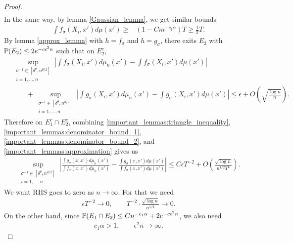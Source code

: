 \begin{proof}
\begin{align}
    \end{align}
    In the same way, by lemma \ref{Gaussian_lemma}, we get similar bounds
    \begin{align} \label{important_lemmas:denominator_bound_2}
        \int f_{\sigma}(X_i,x')d\mu(x') \geq & (1-Cm^{-c_1 \alpha}) T \geq \frac{1}{2} T.
    \end{align}
    By lemma \ref{approx_lemma} with $h = f_{\sigma}$ and $h = g_{\sigma}$, there exits $E_2$ with $\mathbb{P}(E_2) \leq 2e^{-c\epsilon^2n}$ such that on $E_2^c$,
    \begin{align} \label{important_lemmas:approximation}
         & \sup_{\substack{\sigma^{-1} \in [\delta^{\theta},n^{\theta/2}]          \\ i = 1,\dots, n}} \left|\int f_{\sigma}(X_i,x')d\mu_n(x') - \int f_{\sigma}(X_i,x')d\mu(x') \right| \nonumber \\
         & \qquad + \sup_{\substack{\sigma^{-1} \in [\delta^{\theta},n^{\theta/2}] \\ i = 1,\dots, n}} \left|\int g_{\sigma}(X_i,x')d\mu_n(x') - \int g_{\sigma}(X_i,x')d\mu(x') \right|\leq \epsilon + O\left(\sqrt{\frac{\log n}{n}}\right).
    \end{align}
    Therefore on $E_1^c \cap E_2^c$, combining \eqref{important_lemmas:triangle_inequality}, \eqref{important_lemmas:denominator_bound_1}, \eqref{important_lemmas:denominator_bound_2}, and \eqref{important_lemmas:approximation} gives us
    \begin{align} \label{important_lemmas:approximation_2}
        \sup_{\substack{\sigma^{-1} \in [\delta^{\theta},n^{\theta/2}] \\ i = 1,\dots, n}} \left|\frac{\int g_{\sigma}(x,x') d\mu_n(x')}{\int f_{\sigma}(x,x') d\mu_n(x')}-\frac{\int g_{\sigma}(x,x') d\mu(x')}{\int f_{\sigma}(x,x') d\mu(x')}\right| \leq C \epsilon T^{-2} + O\left(\frac{\sqrt{\log n}}{n^{1/2}T^2}\right).
    \end{align}
    We want RHS goes to zero as $n \to \infty$. For that we need
    \begin{align} \label{important_lemmas:convergence_conditions_1}
        \epsilon T^{-2} \to 0, \qquad  T^{-2} \cdot \frac{\sqrt{\log n}}{n^{1/2}} \to 0.
    \end{align}
    On the other hand, since $\mathbb{P}(E_1 \cap E_2) \leq Cn^{-c_1 \alpha} + 2e^{-c\epsilon^2n}$, we also need
    \begin{align}  \label{important_lemmas:convergence_conditions_2}
        c_1 \alpha > 1, \qquad \epsilon^2 n \to \infty.
    \end{align}

\end{proof}
